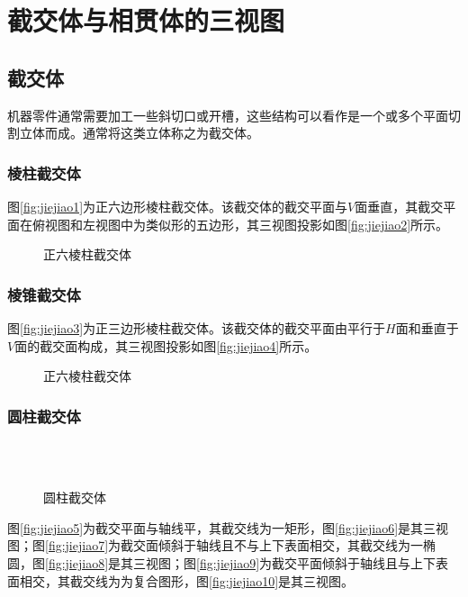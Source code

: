 \section{截交体与相贯体的三视图}
\subsection{截交体}
 机器零件通常需要加工一些斜切口或开槽，这些结构可以看作是一个或多个平面切割立体而成。通常将这类立体称之为截交体。
 \subsubsection{棱柱截交体}
 图\ref{fig:jiejiao1}为正六边形棱柱截交体。该截交体的截交平面与$V$面垂直，其截交平面在俯视图和左视图中为类似形的五边形，其三视图投影如图\ref{fig:jiejiao2}所示。
 \begin{figure}[htbp]
 \centering
{}\hspace{30pt}
\caption{正六棱柱截交体}
\end{figure}
\subsubsection{棱锥截交体}
 图\ref{fig:jiejiao3}为正三边形棱柱截交体。该截交体的截交平面由平行于$H$面和垂直于$V$面的截交面构成，其三视图投影如图\ref{fig:jiejiao4}所示。
 \begin{figure}[htbp]
 \centering
{}\hspace{30pt}
\caption{正六棱柱截交体}
\end{figure}
\subsubsection{圆柱截交体}
 \begin{figure}[htbp]
 \centering
{}\hspace{60pt}
\\
\hspace{60pt}
\\
\hspace{60pt}
\caption{圆柱截交体}
\end{figure}
图\ref{fig:jiejiao5}为截交平面与轴线平，其截交线为一矩形，图\ref{fig:jiejiao6}是其三视图；图\ref{fig:jiejiao7}为截交面倾斜于轴线且不与上下表面相交，其截交线为一椭圆，图\ref{fig:jiejiao8}是其三视图；图\ref{fig:jiejiao9}为截交平面倾斜于轴线且与上下表面相交，其截交线为为复合图形，图\ref{fig:jiejiao10}是其三视图。
\clearpage
